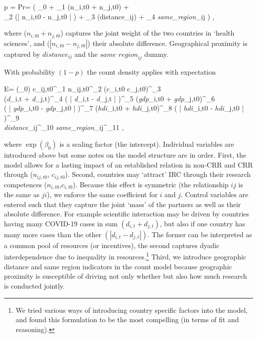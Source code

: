 \begin{gather+}[1]
	p = Pr\left[ c_{ij,t} = 0 | \boldsymbol{\gamma} \right] = ( \gamma_0 + \gamma_1 \log(n_{i,t0} + n_{j,t0}) + \\
	\gamma_2 \log(| n_{i,t0} - n_{j,t0} | ) +
	\gamma_3 \log(distance_{ij}) + \gamma_4 \textit{same\_region}_{ij}  ) \textit{   ,}
\end{gather+}

where ($n_{i,t0}+n_{j,t0}$) captures the joint weight of the two countries in `health sciences', and ($| n_{i,t0} - n_{j,t0} |$) their absolute difference. Geographical proximity is captured by $\textit{distance}_{ij}$ and the $\textit{same region}_{ij}$ dummy. 

With probability $(1-p)$ the count density applies with expectation

\begin{gather+}[1]
	E = \exp(\beta_0) c_{ij,t0}^{\beta_1} n_{ij,t0}^{\beta_2} (c_{i,t0} c_{j,t0})^{\beta_3} \times \\
	(\textit{d}_{i,t} + \textit{d}_{j,t})^{\beta_4} \left( | \textit{d}_{i,t} - \textit{d}_{j,t} | \right)^{\beta_5} 
	(\textit{gdp}_{i,t0} + \textit{gdp}_{j,t0})^{\beta_6}  \times \\
	\left( | \textit{gdp}_{i,t0} - \textit{gdp}_{j,t0} |  \right)^{\beta_7} 
	(\textit{hdi}_{i,t0} + \textit{hdi}_{j,t0})^{\beta_8} 
	\left( | \textit{hdi}_{i,t0} - \textit{hdi}_{j,t0} | \right)^{\beta_9} \\
	\textit{distance}_{ij}^{\beta_{10}} \: \textit{same\_region}_{ij}^{\beta_{11}} \textit{   ,}
\end{gather+}

where $\exp(\beta_0)$ is a scaling factor (the intercept). Individual variables are introduced above but some notes on the model structure are in order. First, the model allows for a lasting impact of an established relation in non-CRR and CRR through ($n_{ij,t0}$, $c_{ij,t0}$). Second, countries may `attract' IRC through their research competences ($n_{i,t0}$,$c_{i,t0}$). Because this effect is symmetric (the relationship $ij$ is the same as $ji$), we enforce the same coefficient for $i$ and $j$. Control variables are entered such that they capture the joint `mass' of the partners as well as their absolute difference. For example scientific interaction may be driven by countries having many COVID-19 cases in sum $(\textit{d}_{i,t} + \textit{d}_{j,t})$, but also if one country has many more cases than the other $(| \textit{d}_{i,t} - \textit{d}_{j,t} |)$. The former can be interpreted as a common pool of resources (or incentives), the second captures dyadic interdependence due to inequality in resources.\footnote{We tried various ways of introducing country specific factors into the model, and found this formulation to be the most compelling (in terms of fit and reasoning).} Third, we introduce geographic distance and same region indicators in the count model because geographic proximity is susceptible of driving not only whether but also how much research is conducted jointly. 

